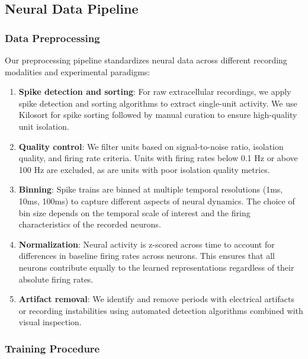 \subsection{Neural Data Pipeline}

\subsubsection{Data Preprocessing}

Our preprocessing pipeline standardizes neural data across different recording modalities and experimental paradigms:

\begin{enumerate}
\item \textbf{Spike detection and sorting}: For raw extracellular recordings, we apply spike detection and sorting algorithms to extract single-unit activity. We use Kilosort for spike sorting followed by manual curation to ensure high-quality unit isolation.

\item \textbf{Quality control}: We filter units based on signal-to-noise ratio, isolation quality, and firing rate criteria. Units with firing rates below 0.1 Hz or above 100 Hz are excluded, as are units with poor isolation quality metrics.

\item \textbf{Binning}: Spike trains are binned at multiple temporal resolutions (1ms, 10ms, 100ms) to capture different aspects of neural dynamics. The choice of bin size depends on the temporal scale of interest and the firing characteristics of the recorded neurons.

\item \textbf{Normalization}: Neural activity is z-scored across time to account for differences in baseline firing rates across neurons. This ensures that all neurons contribute equally to the learned representations regardless of their absolute firing rates.

\item \textbf{Artifact removal}: We identify and remove periods with electrical artifacts or recording instabilities using automated detection algorithms combined with visual inspection.
\end{enumerate}

\subsubsection{Training Procedure}

